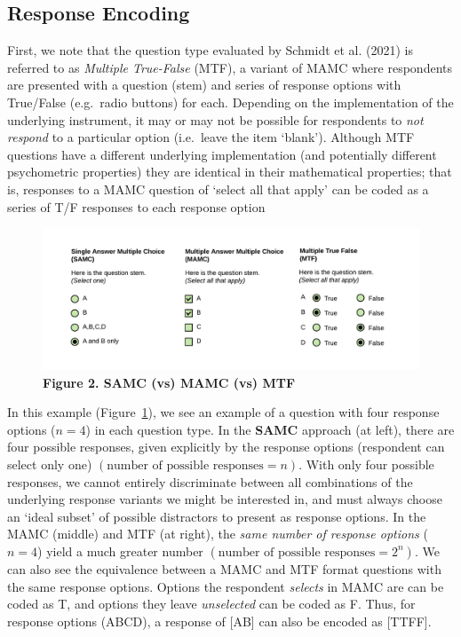 \documentclass[
  letterpaper,
  DIV=11,
  numbers=noendperiod]{scrreprt}
\begin{document}
\hypertarget{response-encoding}{%
\subsection{Response Encoding}\label{response-encoding}}

First, we note that the question type evaluated by Schmidt et al. (2021)
is referred to as \emph{Multiple True-False} (MTF), a variant of MAMC
where respondents are presented with a question (stem) and series of
response options with True/False (e.g.~radio buttons) for each.
Depending on the implementation of the underlying instrument, it may or
may not be possible for respondents to \emph{not respond} to a
particular option (i.e.~leave the item `blank'). Although MTF questions
have a different underlying implementation (and potentially different
psychometric properties) they are identical in their mathematical
properties; that is, responses to a MAMC question of `select all that
apply' can be coded as a series of T/F responses to each response option

\begin{figure}

{\centering \includegraphics{analysis/SGC3A/static/img/MAMC-MTF.png}

}

\caption{\label{fig-ItemTypes}\textbf{Figure 2. SAMC (vs) MAMC (vs)
MTF}}

\end{figure}

In this example (Figure~\ref{fig-ItemTypes}), we see an example of a
question with four response options (\(n=4\)) in each question type. In
the \textbf{SAMC} approach (at left), there are four possible responses,
given explicitly by the response options (respondent can select only
one) \((\text{number of possible responses} = n)\). With only four
possible responses, we cannot entirely discriminate between all
combinations of the underlying response variants we might be interested
in, and must always choose an `ideal subset' of possible distractors to
present as response options. In the MAMC (middle) and MTF (at right),
the \emph{same number of response options} (\(n=4\)) yield a much
greater number \((\text{number of possible responses} = 2^{n})\). We can
also see the equivalence between a MAMC and MTF format questions with
the same response options. Options the respondent \emph{selects} in MAMC
are can be coded as T, and options they leave \emph{unselected} can be
coded as F. Thus, for response options (ABCD), a response of {[}AB{]}
can also be encoded as {[}TTFF{]}.
\end{document}
